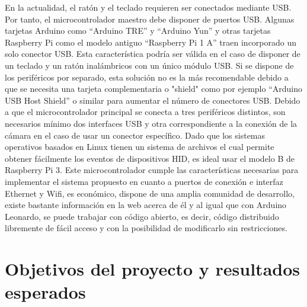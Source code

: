 En la actualidad, el ratón y el teclado requieren ser conectados mediante USB. Por tanto, el microcontrolador maestro debe disponer de puertos USB. Algunas tarjetas Arduino como “Arduino TRE” y “Arduino Yun” y otras tarjetas Raspberry Pi como el modelo antiguo “Raspberry Pi 1 A” traen incorporado un solo conector USB. Esta característica podría ser válida en el caso de disponer de un teclado y un ratón inalámbricos con un único módulo USB. Si se dispone de los periféricos por separado, esta solución no es la más recomendable debido a que se necesita una tarjeta complementaria o "shield" como por ejemplo “Arduino USB Host Shield” o similar para aumentar el número de conectores USB. Debido a que el microcontrolador principal se conecta a tres periféricos distintos, son necesarios mínimo dos interfaces USB y otra correspondiente a la conexión de la cámara en el caso de usar un conector específico. Dado que los sistemas operativos basados en Linux tienen un sistema de archivos el cual permite obtener fácilmente los eventos de dispositivos HID, es ideal usar el modelo B de Raspberry Pi 3. Este microcontrolador cumple las características necesarias para implementar el sistema propuesto en cuanto a puertos de conexión e interfaz Ethernet y Wifi, es económico, dispone de una amplia comunidad de desarrollo, existe bastante información en la web acerca de él y al igual que con Arduino Leonardo, se puede trabajar con código abierto, es decir, código distribuido libremente de fácil acceso y con la posibilidad de modificarlo sin restricciones.


\section{Objetivos del proyecto y resultados esperados} \label{s1_4}

